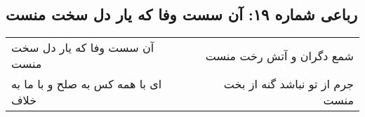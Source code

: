 \begin{center}
\section*{رباعی شماره ۱۹: آن سست وفا که یار دل سخت منست}
\label{sec:019}
\begin{longtable}{l p{0.5cm} r}
آن سست وفا که یار دل سخت منست
&&
شمع دگران و آتش رخت منست
\\
ای با همه کس به صلح و با ما به خلاف
&&
جرم از تو نباشد گنه از بخت منست
\\
\end{longtable}
\end{center}
